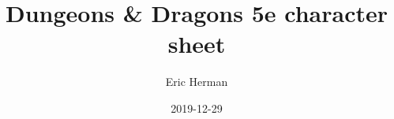 \documentclass{article}
\title{Dungeons \& Dragons 5e character sheet}
\date{2019-12-29}
\author{Eric Herman}
\begin{document}
\newpage
\raggedright


\newcommand{\DndSkipCombatSpecialSectionHeader}{1}

\newcommand{\DndSkipRaceSectionHeader}{1}

\newcommand{\DndSkipClassAbilitiesSectionHeader}{1}

\newcommand{\DndSkipSpecialAbilitiesSectionHeader}{1}

\newpage
\raggedright



\end{document}
